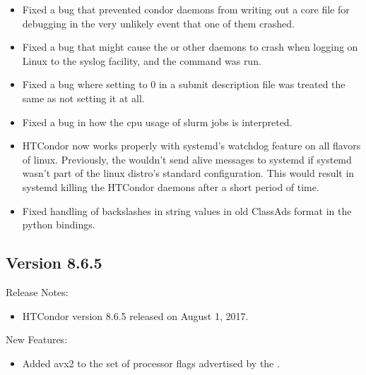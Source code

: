 \begin{itemize}

\item Fixed a bug that prevented condor daemons from writing out a
core file for debugging in the very unlikely event that one of them
crashed.

\item Fixed a bug that might cause the  or other daemons to
crash when logging on Linux to the syslog facility, and the 
command was run.

\item Fixed a bug where setting 
to 0 in a submit description file was treated the same as not setting
it at all.

\item Fixed a bug in how the cpu usage of slurm jobs is interpreted.

\item HTCondor now works properly with systemd's watchdog feature on
all flavors of linux.
Previously, the  wouldn't send alive messages to systemd
if systemd wasn't part of the linux distro's standard configuration.
This would result in systemd killing the HTCondor daemons after a
short period of time.

\item Fixed handling of backslashes in string values in old ClassAds
format in the python bindings.

\end{itemize}

\subsection*{\label{sec:New-8-6-5}Version 8.6.5}

\noindent Release Notes:

\begin{itemize}

\item HTCondor version 8.6.5 released on August 1, 2017.

\end{itemize}


\noindent New Features:

\begin{itemize}

\item Added avx2 to the set of processor flags advertised by the
.

\end{itemize}

